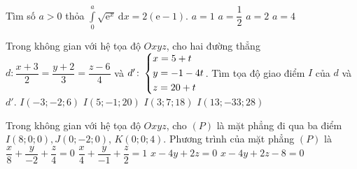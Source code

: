 \begin{ex}%
	Tìm số $a>0$ thỏa $\displaystyle\int\limits_0^a{\sqrt{\mathrm{e}^x}\mathrm{\,d}x=2(\mathrm{e} - 1)}$. 
	\choice
	{$a=1$}
	{$a=\dfrac{1}{2}$}
	{\True $a=2$}
	{$a=4$}
\end{ex}
\begin{ex}%
	Trong không gian với hệ tọa độ $Oxyz$, cho hai đường thẳng $d\colon \dfrac{x + 3}{2}=\dfrac{y + 2}{3}=\dfrac{z - 6}{4}$ và $d'\colon \left\{\begin{aligned}&x=5+t\\&y=-1-4t\\&z=20+t\end{aligned}\right.$. Tìm tọa độ giao điểm $I$ của $d$ và $d'$. 
	\choice
	{$I\left(- 3; - 2; 6\right)$}
	{$I\left(5; - 1; 20\right)$}
	{\True $I\left(3; 7; 18\right)$}
	{$I\left(13; - 33; 28\right)$}
\end{ex}

\begin{ex}%
	Trong không gian với hệ tọa độ $Oxyz$, cho $(P)$ là mặt phẳng đi qua ba điểm $I\left(8; 0; 0\right), J\left(0; - 2; 0\right)$, $K\left(0; 0; 4\right)$. Phương trình của mặt phẳng $(P)$ là 
	\choice
	{$\dfrac{x}{8} + \dfrac{y}{- 2} + \dfrac{z}{4}=0$}
	{$\dfrac{x}{4} + \dfrac{y}{- 1} + \dfrac{z}{2}=1$}
	{$x - 4y + 2z=0$}
	{\True $x - 4y + 2z - 8=0$}
\end{ex}

